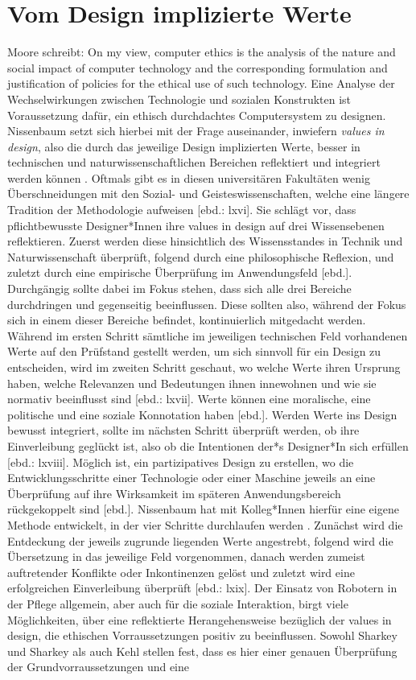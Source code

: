 \section{Vom Design implizierte Werte}
\label{sec:values}
Moore schreibt: \glqq On my view, computer ethics is the analysis of the nature and social impact of computer technology and the corresponding formulation and justification of policies for the ethical use of such technology\grqq \cite[1]{comEthics}. Eine Analyse der Wechselwirkungen zwischen Technologie und sozialen Konstrukten ist Voraussetzung dafür,  ein ethisch durchdachtes Computersystem zu designen. Nissenbaum setzt sich hierbei mit der Frage auseinander, inwiefern \textit{values in design}, also die durch das jeweilige Design implizierten Werte, besser in technischen und naturwissenschaftlichen Bereichen reflektiert und integriert werden können \cite{nissenbaum}. Oftmals gibt es in diesen universitären Fakultäten wenig Überschneidungen mit den Sozial- und Geisteswissenschaften, welche eine längere Tradition der Methodologie aufweisen [ebd.: lxvi]. Sie schlägt vor, dass pflichtbewusste Designer*Innen ihre values in design auf drei Wissensebenen reflektieren. Zuerst werden diese hinsichtlich des Wissensstandes in Technik und Naturwissenschaft überprüft, folgend durch eine philosophische Reflexion, und zuletzt durch eine empirische Überprüfung im Anwendungsfeld [ebd.]. Durchgängig sollte dabei im Fokus stehen, dass sich alle drei Bereiche durchdringen und gegenseitig beeinflussen. Diese sollten also, während der Fokus sich in einem dieser Bereiche befindet, kontinuierlich mitgedacht werden. Während  im ersten Schritt sämtliche im jeweiligen technischen Feld vorhandenen Werte auf den Prüfstand gestellt werden, um sich sinnvoll für ein Design zu entscheiden, wird im zweiten Schritt geschaut, wo welche Werte ihren Ursprung haben, welche Relevanzen und Bedeutungen ihnen innewohnen und wie sie normativ beeinflusst sind [ebd.: lxvii]. Werte können eine moralische, eine politische und eine soziale Konnotation haben [ebd.]. Werden Werte ins Design bewusst integriert, sollte im nächsten Schritt überprüft werden, ob ihre Einverleibung geglückt ist, also ob die Intentionen der*s Designer*In sich erfüllen [ebd.: lxviii]. Möglich ist, ein partizipatives Design zu erstellen, wo die Entwicklungsschritte einer Technologie oder einer Maschine jeweils an eine Überprüfung auf ihre Wirksamkeit im späteren Anwendungsbereich rückgekoppelt sind [ebd.]. Nissenbaum hat mit Kolleg*Innen hierfür eine eigene Methode entwickelt, in der  vier Schritte durchlaufen werden \cite{nissenbaum}. Zunächst wird die Entdeckung der jeweils zugrunde liegenden Werte angestrebt, folgend wird die Übersetzung in das jeweilige Feld vorgenommen, danach werden zumeist auftretender Konflikte oder Inkontinenzen gelöst und zuletzt wird eine erfolgreichen Einverleibung überprüft [ebd.: lxix]. Der Einsatz von Robotern in der Pflege allgemein, aber auch für die soziale Interaktion, birgt viele Möglichkeiten, über eine reflektierte Herangehensweise bezüglich der values in design, die ethischen Vorraussetzungen positiv zu beeinflussen. Sowohl Sharkey und Sharkey als auch Kehl stellen fest, dass es hier einer genauen Überprüfung der Grundvorraussetzungen und eine 